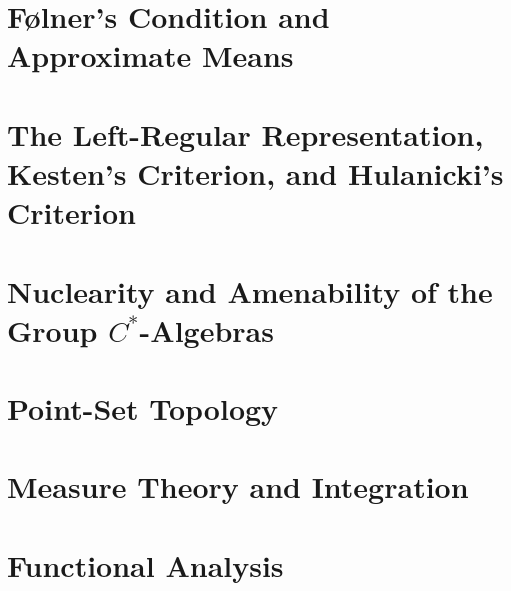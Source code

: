 \documentclass[10pt]{package2}
\newcommand{\1}{\mathds{1}}
\begin{document}
\chapter{Følner's Condition and Approximate Means}\label{ch:folner_condition}

\chapter{The Left-Regular Representation, Kesten's Criterion, and Hulanicki's Criterion}\label{ch:left_regular_representation}
\chapter{Nuclearity and Amenability of the Group $C^{\ast}$-Algebras}\label{ch:nuclearity}
\appendix
\chapter{Point-Set Topology}\label{ch:point_set_topology}

\chapter{Measure Theory and Integration}\label{ch:measure_theory}

\chapter{Functional Analysis}\label{ch:functional_analysis}

\nocite{*}
\printbibliography
\end{document}
